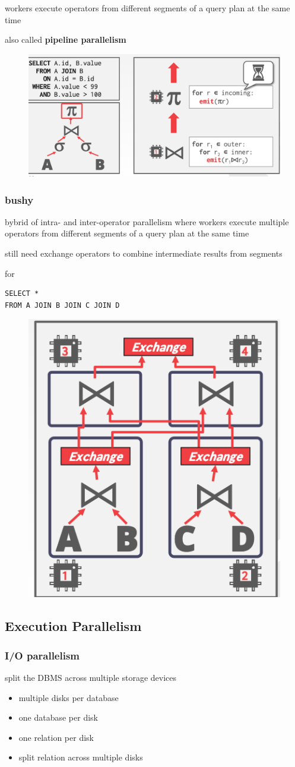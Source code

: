 \documentclass[11pt]{article}
\begin{document}
workers execute operators from different segments of a query plan at the same time

also called \textbf{pipeline parallelism}

\begin{figure}[htbp]
\centering
\includegraphics[width=.6\textwidth]{../images/15445/34.png}
\label{}
\end{figure}
\subsubsection{bushy}
\label{sec:orgdeb4ab2}
bybrid of intra- and inter-operator parallelism where workers execute multiple operators from
different segments of a query plan at the same time

still need exchange operators to combine intermediate results from segments

for
\begin{verbatim}
SELECT *
FROM A JOIN B JOIN C JOIN D
\end{verbatim}

\begin{figure}[htbp]
\centering
\includegraphics[width=.4\textwidth]{../images/15445/35.png}
\label{}
\end{figure}
\subsection{Execution Parallelism}
\label{sec:orgcbc3a32}
\subsubsection{I/O parallelism}
\label{sec:org9f5bf48}
split the DBMS across multiple storage devices
\begin{itemize}
\item multiple disks per database
\item one database per disk
\item one relation per disk
\item split relation across multiple disks
\end{itemize}
\end{document}
